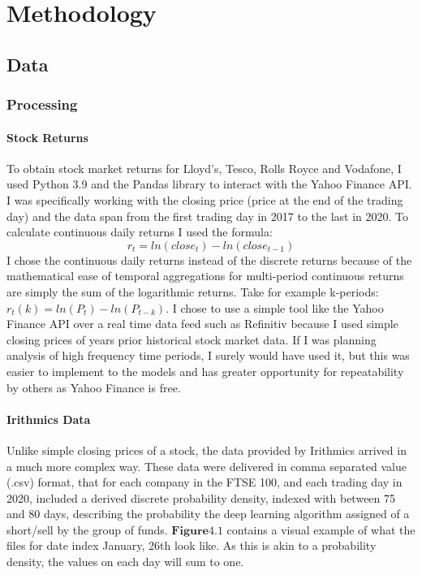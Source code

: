 \chapter{Methodology}

\section{Data}
\subsection{Processing}
\subsubsection{Stock Returns}
To obtain stock market returns for Lloyd's, Tesco, Rolls Royce and Vodafone, I used Python 3.9 \cite{Python3} and the Pandas \cite{pandas} library to interact with the Yahoo Finance API. I was specifically working with the closing price (price at the end of the trading day) and the data span from the first trading day in 2017 to the last in 2020. To calculate continuous daily returns I used the formula:
$$
r_t = ln({close}_t) - ln({close}_{t-1})
$$
I chose the continuous daily returns instead of the discrete returns because of the mathematical ease of temporal aggregations for multi-period continuous returns are simply the sum of the logarithmic returns. Take for example k-periods: $r_t(k) = ln(P_t) - ln(P_{t-k})$. I chose to use a simple tool like the Yahoo Finance API over a real time data feed such as Refinitiv because I used simple closing prices of years prior historical stock market data. If I was planning analysis of high frequency time periods, I surely would have used it, but this was easier to implement to the models and has greater opportunity for repeatability by others as Yahoo Finance is free. 

\subsubsection{Irithmics Data}
Unlike simple closing prices of a stock, the data provided by Irithmics arrived in a much more complex way. These data were delivered in comma separated value (.csv) format, that for each company in the FTSE 100, and each trading day in 2020, included a derived discrete probability density, indexed with between 75 and 80 days, describing the probability the deep learning algorithm assigned of a short/sell by the group of funds. $\mathbf{Figure 4.1}$ contains a visual example of what the files for date index January, 26th look like. As this is akin to a probability density, the values on each day will sum to one. 

